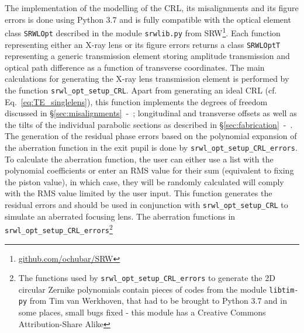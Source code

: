 \begin{refsection}
The implementation of the modelling of the CRL, its misalignments and its figure errors is done using Python 3.7 and is fully compatible with the optical element class \texttt{SRWLOpt} described in the module \texttt{srwlib.py} from SRW\footnote{\url{github.com/ochubar/SRW}}. Each function representing either an X-ray lens or its figure errors returns a class \texttt{SRWLOptT} representing a generic transmission element storing amplitude transmission and optical path difference as a function of transverse coordinates. The main calculations for generating the X-ray lens transmission element is performed by the function \texttt{srwl\_opt\_setup\_CRL}. Apart from generating an ideal CRL (cf. Eq.~\ref{eq:TE_singlelens}), this function implements the degrees of freedom discussed in \S\ref{sec:misalignments}~-~\textit{}; longitudinal and transverse offsets as well as the tilts of the individual parabolic sections as described in \S\ref{sec:fabrication}~-~\textit{}. The generation of the residual phase errors based on the polynomial expansion of the aberration function in the exit pupil is done by \texttt{srwl\_opt\_setup\_CRL\_errors}. To calculate the aberration function, the user can either use a list with the polynomial coefficients or enter an RMS value for their sum (equivalent to fixing the piston value), in which case, they will be randomly calculated will comply with the RMS value limited by the user input. This function generates the residual errors and should be used in conjunction with \texttt{srwl\_opt\_setup\_CRL} to simulate an aberrated focusing lens. The aberration functions in \texttt{srwl\_opt\_setup\_CRL\_errors}\footnote{The functions used by \texttt{srwl\_opt\_setup\_CRL\_errors} to generate the 2D circular Zernike polynomials contain pieces of codes from the module \texttt{libtim-py} from Tim van Werkhoven, that had to be brought to Python 3.7 and in some places, small bugs fixed - this module has a Creative Commons Attribution-Share Alike
}
\end{refsection}

